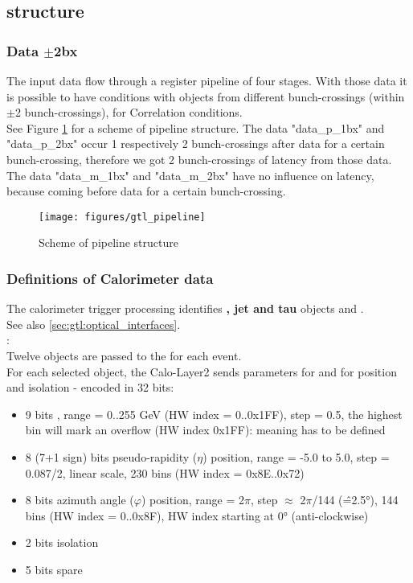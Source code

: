 \clearpage

\subsection{\ugtl structure}
\label{sec:gtl:mgtl_structure}

\subsubsection{Data $\pm$2bx}
\label{sec:gtl:data_p_m_2bx}

The \ugtl input data flow through a register pipeline of four stages. With those data it is possible to have conditions with objects from
different bunch-crossings (within $\pm$2 bunch-crossings), \egamma for Correlation conditions.\\
See Figure \ref{fig:gtl:gtl_pipeline} for a scheme of \ugtl pipeline structure. The data "data\_p\_1bx" and "data\_p\_2bx" occur 1 respectively 2 bunch-crossings
after data for a certain bunch-crossing, therefore we got 2 bunch-crossings of latency from those data. The data "data\_m\_1bx" and "data\_m\_2bx" have no influence
on latency, because coming before data for a certain bunch-crossing.

\begin{figure}[htb]
\centering
\texttt{[image: figures/gtl\_pipeline]}
\caption{Scheme of \ugtl pipeline structure}
\label{fig:gtl:gtl_pipeline}
\end{figure}


\subsubsection{Definitions of Calorimeter data}
\label{sec:gtl:calorimeter_data}

The calorimeter trigger processing identifies \textbf{\egamma, jet and tau} objects and \textbf{\esums}.\\
See also \ref{sec:gtl:optical_interfaces}.\\

\textbf{\egamma}:\\ Twelve objects are passed to the \ugt for each event.\\
For each selected object, the Calo-Layer2 sends parameters for \pt and for position and isolation - encoded in 32 bits:
\begin{itemize}
\item 9 bits \pt, range = 0..255 GeV (HW index = 0..0x1FF), step = 0.5, the highest bin will mark an overflow (HW index 0x1FF): meaning has to be defined
\item 8 (7+1 sign) bits pseudo-rapidity ($\eta$) position, range = -5.0 to 5.0, step = 0.087/2, linear scale, 230 bins (HW index = 0x8E..0x72)
\item 8 bits azimuth angle ($\varphi$) position, range = 2$\pi$, step $\approx$ 2$\pi$/144 (\^=2.5°), 144 bins (HW index = 0..0x8F), HW index starting at 0° (anti-clockwise)
\item 2 bits isolation
\item 5 bits spare
\end{itemize}

